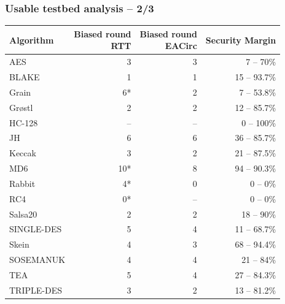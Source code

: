 \documentclass[aspectratio=169]{beamer}
\begin{document}
\begin{frame}
\frametitle{Usable testbed analysis -- 2/3}

\begin{table}
\begin{nomar}
\centering

\scalebox{0.75} {
\begin{tabular}{l || r | r | r }
\textbf{Algorithm} & \thead{Biased round \\ RTT} & \thead{Biased round \\ EACirc} & \textbf{Security Margin} \\ \hline \hline
AES        & 3                          & 3  & 7 -- 70\% \\
BLAKE      & 1                          & 1  & 15 -- 93.7\% \\
Grain      & \cellcolor{green!40}6*     & 2  & 7 -- 53.8\% \\
Gr\o stl   & 2                          & 2  & 12 -- 85.7\% \\
HC-128     & --                         & -- & 0 -- 100\% \\
JH         & 6                          & 6  & 36 -- 85.7\% \\
Keccak     & \cellcolor{green!40}3      & 2  & 21 -- 87.5\% \\
MD6        & \cellcolor{green!40}10*    & 8  & 94 -- 90.3\% \\
Rabbit     & \cellcolor{green!40}4*     & 0  & \cellcolor{red!40}0 -- 0\% \\
RC4        & \cellcolor{green!40}0*     & -- & \cellcolor{red!40}0 -- 0\% \\
Salsa20    & 2                          & 2  & 18 -- 90\% \\
SINGLE-DES & \cellcolor{green!40}5      & 4  & 11 -- 68.7\% \\
Skein      & \cellcolor{green!40}4      & 3  & 68 -- 94.4\% \\
SOSEMANUK  & 4                          & 4  & 21 -- 84\% \\
TEA        & \cellcolor{green!40}5      & 4  & 27 -- 84.3\% \\
TRIPLE-DES & \cellcolor{green!40}3      & 2  & 13 -- 81.2\% \\
\end{tabular}
}
\end{nomar}
\end{table}

\end{frame}
\end{document}
